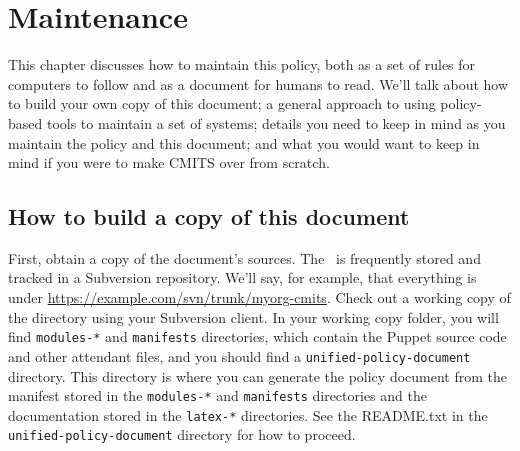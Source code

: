 %
%
%
\chapter{Maintenance}
\label{Maintenance}

This chapter discusses how to maintain this policy, both as a set of
rules for computers to follow and as a document for humans to
read. We'll talk about how to build your own copy of this document; a
general approach to using policy-based tools to maintain a set of
systems; details you need to keep in mind as you maintain the policy
and this document; and what you would want to keep in mind if you were
to make CMITS over from scratch.



\section{How to build a copy of this document}
\label{generating}

First, obtain a copy of the document's sources. The \CMITSPolicy\ is
frequently stored and tracked in a Subversion repository. We'll say, for
example, that everything is under
\url{https://example.com/svn/trunk/myorg-cmits}. Check out a working copy
of the directory using your Subversion client. In your working copy
folder, you will find {\tt modules-*} and {\tt manifests} directories,
which contain the Puppet source code and other attendant files, and you
should find a {\tt unified-policy-document} directory. This directory
is where you can generate the policy document from the manifest stored in
the {\tt modules-*} and {\tt manifests} directories and the documentation
stored in the {\tt latex-*} directories. See the README.txt in the {\tt
unified-policy-document} directory for how to proceed.





